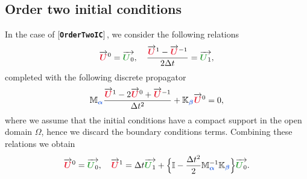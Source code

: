 \documentclass[11pt,a4paper]{article}
\newcommand{\unknown}[1]{\bm{{\color{myred}{#1}}}}
\newcommand{\param}[1]{\bm{{\color{myhyperblue}{#1}}}}
\newcommand{\data}[1]{\bm{{\color{mygreen}{#1}}}}
\newcommand{\keyword}[1]{[\texttt{\textbf{#1}}]\!\,}
\begin{document}
\subsection{Order two initial conditions}
In the case of \keyword{OrderTwoIC}, we consider the following relations
\begin{equation*}
\overrightarrow{\unknown{U}}^0 = \overrightarrow{\data{U}_0}, \quad \dfrac{\overrightarrow{\unknown{U}}^1 - \overrightarrow{\unknown{U}}^{-1}}{2\Delta t} = \overrightarrow{\data{U}_1},
\end{equation*}
completed with the following discrete propagator
\begin{equation*}
\mathbb{M}_{\param{\alpha}}\dfrac{\overrightarrow{\unknown{U}}^{1} - 2\overrightarrow{\unknown{U}}^{0} + \overrightarrow{\unknown{U}}^{-1}}{\Delta t^2} + \mathbb{K}_{\param{\beta}} \overrightarrow{\unknown{U}}^{0} = 0,
\end{equation*}
where we assume that the initial conditions have a compact support in the open domain $\Omega$, hence we discard the boundary conditions terms. Combining these relations we obtain
\begin{equation*}
\overrightarrow{\unknown{U}}^0 = \overrightarrow{\data{U}_0}, \quad \overrightarrow{\unknown{U}}^1 = \Delta t \overrightarrow{\data{U}_1} + \Big\{\mathbb{I} - \dfrac{\Delta t^2}{2} \mathbb{M}_{\param{\alpha}}^{-1}\mathbb{K}_{\param{\beta}}\Big\}\overrightarrow{\data{U}_0}.
\end{equation*}
\end{document}
